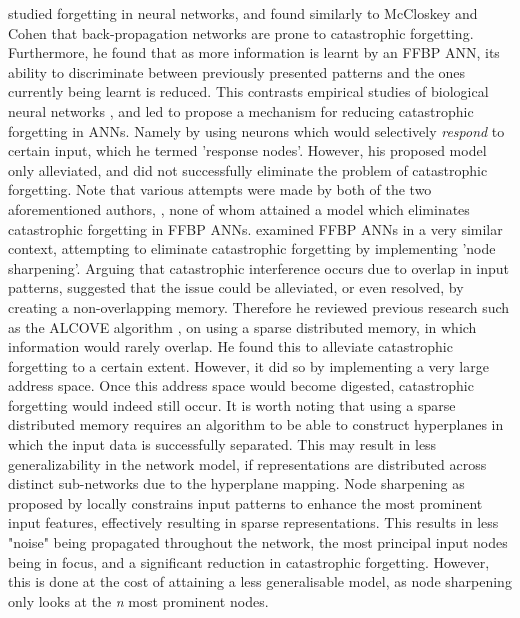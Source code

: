 \cite{Ratcliff1990} studied forgetting in neural networks, and found similarly to McCloskey and Cohen that back-propagation networks are prone to catastrophic forgetting. Furthermore, he found that as more information is learnt by an FFBP ANN, its ability to discriminate between previously presented patterns and the ones currently being learnt is reduced. This contrasts empirical studies of biological neural networks \citep{Ratcliff1990}, and led \cite{Ratcliff1990} to propose a mechanism for reducing catastrophic forgetting in ANNs. Namely by using neurons which would selectively \textit{respond} to certain input, which he termed 'response nodes'. However, his proposed model only alleviated, and did not successfully eliminate the problem of catastrophic forgetting. Note that various attempts were made by both of the two aforementioned authors, \citep{McCloskey1989, Ratcliff1990}, none of whom attained a model which eliminates catastrophic forgetting in FFBP ANNs.
\cite{French1992} examined FFBP ANNs in a very similar context, attempting to eliminate catastrophic forgetting by implementing 'node sharpening'. Arguing that catastrophic interference occurs due to overlap in input patterns, \cite{French1992} suggested that the issue could be alleviated, or even resolved, by creating a non-overlapping memory. Therefore he reviewed previous research such as the ALCOVE algorithm \citep{Kruschke1992}, on using a sparse distributed memory, in which information would rarely overlap. He found this to alleviate catastrophic forgetting to a certain extent. However, it did so by implementing a very large address space. Once this address space would become digested, catastrophic forgetting would indeed still occur. It is worth noting that using a sparse distributed memory requires an algorithm to be able to construct hyperplanes in which the input data is successfully separated. This may result in less generalizability in the network model, if representations are distributed across distinct sub-networks due to the hyperplane mapping.
Node sharpening as proposed by \cite{French1992} locally constrains input patterns to enhance the most prominent input features, effectively resulting in sparse representations. This results in less "noise" being propagated throughout the network, the most principal input nodes being in focus, and a significant reduction in catastrophic forgetting. However, this is done at the cost of attaining a less generalisable model, as node sharpening only looks at the \textit{n} most prominent nodes. 

